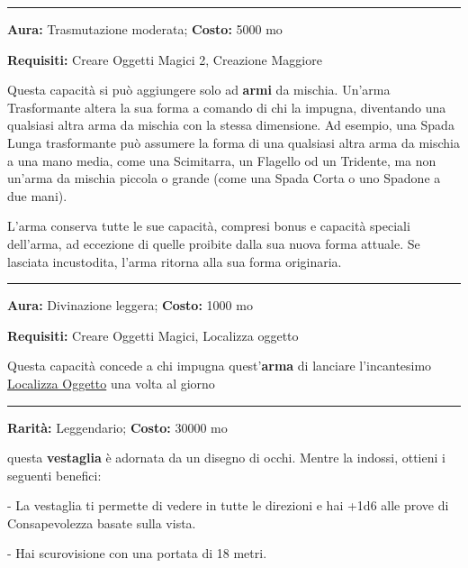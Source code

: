 \begin{multicols}{2}
\smallskip\noindent\rule{\linewidth}{2pt}  \hypertarget{Trasformante}{}\smallskip{}\noindent\label{Trasformante}

\textbf{Aura:} Trasmutazione moderata; \textbf{Costo:} 5000 mo

\textbf{Requisiti:} Creare Oggetti Magici 2, Creazione Maggiore

Questa capacità si può aggiungere solo ad \textbf{armi} da mischia. Un'arma Trasformante altera la sua forma a comando di chi la impugna, diventando una qualsiasi altra arma da mischia con la stessa dimensione. Ad esempio, una Spada Lunga trasformante può assumere la forma di una qualsiasi altra arma da mischia a una mano media, come una Scimitarra, un Flagello od un Tridente, ma non un'arma da mischia piccola o grande (come una Spada Corta o uno Spadone a due mani).

L'arma conserva tutte le sue capacità, compresi bonus e capacità speciali dell'arma, ad eccezione di quelle proibite dalla sua nuova forma attuale. Se lasciata incustodita, l'arma ritorna alla sua forma originaria.

\smallskip\noindent\rule{\linewidth}{2pt}  \hypertarget{Trovacose}{}\smallskip{}\noindent\label{Trovacose}

\textbf{Aura:} Divinazione leggera; \textbf{Costo:} 1000 mo

\textbf{Requisiti:} Creare Oggetti Magici, Localizza oggetto

Questa capacità concede a chi impugna quest'\textbf{arma} di lanciare l'incantesimo \hyperlink{Localizza Oggetto}{Localizza Oggetto} una volta al giorno

\smallskip\noindent\rule{\linewidth}{2pt}  \hypertarget{TunicadegliOcchi}{}\smallskip{}\noindent\label{TunicadegliOcchi}

\textbf{Rarità:} Leggendario; \textbf{Costo:} 30000 mo

questa \textbf{vestaglia} è adornata da un disegno di occhi. Mentre la indossi, ottieni i seguenti benefici:

- La vestaglia ti permette di vedere in tutte le direzioni e hai +1d6 alle prove di Consapevolezza basate sulla vista.

- Hai scurovisione con una portata di 18 metri.


\end{multicols}
